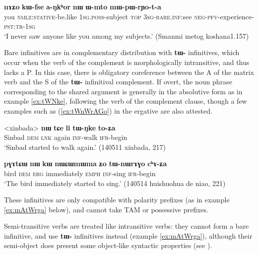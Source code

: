 \documentclass[oldfontcommands,oneside,a4paper,11pt]{article}
\newcommand{\ipa}[1]{\textbf{\phon#1}} %
\begin{document}
\begin{exe}
\ex \label{ex:Wmto}
\gll \ipa{nɤʑo} 	\ipa{kɯ-fse} 	\ipa{a-ŋkʰor} 	\ipa{nɯ} 	\ipa{ɯ-mto} 	\ipa{mɯ-pɯ-rɲo-t-a} \\
you \textsc{nmlz:stative}-be.like \textsc{1sg.poss}-subject \textsc{top} \textsc{3sg}-\textsc{bare.inf:}see \textsc{neg-pfv}-experience-\textsc{pst:tr-1sg} \\
\glt  `I never saw anyone like you among my subjects.' (Smanmi metog koshana1.157)
\end{exe} 

Bare infinitives are in complementary distribution with \ipa{tɯ-} infinitives,  which occur when the verb of the complement is morphologically intransitive, and thus lacks a P. In this case, there is obligatory coreference between the A of the matrix verb and the S of the \ipa{tɯ-} infinitival complement. If overt, the noun phrase corresponding to the shared argument is generally in the absolutive form as in example \ref{ex:tWNke}, following the verb of the complement clause, though a few examples such as (\ref{ex:tWnWrAGo}) in the ergative are also attested.

\begin{exe}
\ex \label{ex:tWNke}
\gll
<xinbada> 	\ipa{nɯ} 	\ipa{tɕe} 	\ipa{li} 	\ipa{tɯ-ŋke} 	\ipa{to-ʑa} \\
Sinbad \textsc{dem} \textsc{lnk} again  \textsc{inf}-walk \textsc{ifr}-begin \\
\glt `Sinbad started to walk again.' (140511 xinbada, 217)
\end{exe}


\begin{exe}
\ex \label{ex:tWnWrAGo}
\gll \ipa{pɣɤtɕɯ} 	\ipa{nɯ} 	\ipa{kɯ} 	\ipa{nɯɕɯmɯma} 	\ipa{ʑo} 	\ipa{tɯ-nɯrɤɣo} 	\ipa{cʰɤ-ʑa} \\
bird \textsc{dem} \textsc{erg} immediately \textsc{emph} \textsc{inf}-sing \textsc{ifr}-begin \\
\glt `The bird immediately started to sing.' (140514 huishuohua de niao, 221)
\end{exe}

These infinitives are only compatible with polarity prefixes (as in example \ref{ex:mAtWrga} below), and cannot take TAM or possessive prefixes.

Semi-transitive verbs are treated like intransitive verbs: they cannot form a bare infinitive, and use \ipa{tɯ-} infinitives instead (example \ref{ex:mAtWrga}), although their semi-object does present some object-like syntactic properties (see \citealt{jacques16relatives}).  
\end{document}
